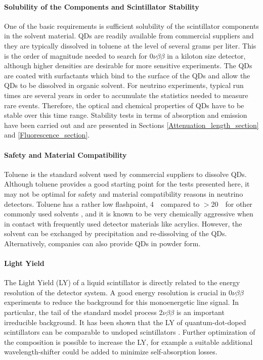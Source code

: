 \documentclass[cits]{JINST}
\begin{document}
\paragraph{Solubility of the Components and Scintillator Stability}
One of the basic requirements is sufficient solubility of the scintillator components in the solvent material. QDs are readily available from commercial suppliers and they are typically dissolved in toluene at the level of several grams per liter. This is the order of magnitude needed to search for 0$\nu\beta\beta$ in a kiloton size detector, although higher densities are desirable for more sensitive experiments\cite{biller}. The QDs are coated with surfactants which bind to the surface of the QDs and allow the QDs to be dissolved in organic solvent. For neutrino experiments, typical run times are several years in order to accumulate the statistics needed to measure rare events. Therefore, the optical and chemical properties of QDs have to be stable over this time range. Stability tests in terms of absorption and emission have been carried out and are presented in Sections \ref{Attenuation_length_section} and \ref{Fluorescence_section}.

\paragraph{Safety and Material Compatibility}
Toluene is the standard solvent used by commercial suppliers to dissolve QDs. Although toluene provides a good starting point for the tests presented here, it may not be optimal for safety and material compatibility reasons in neutrino detectors. Toluene has a rather low flashpoint, 4~\textcelsius~compared to $>$20~\textcelsius~for other commonly used solvents \cite{yeh2007}, and it is known to be very chemically aggressive when in contact with frequently used detector materials like acrylics. However, the solvent can be exchanged by precipitation and re-dissolving of the QDs. Alternatively, companies can also provide QDs in powder form. 

\paragraph{Light Yield} 
The Light Yield (LY) of a liquid scintillator is directly related to the energy resolution of the detector system. A good energy resolution is crucial in 0$\nu\beta\beta$ experiments to reduce the background for this monoenergetic line signal. In particular, the tail of the standard model process 2$\nu\beta\beta$ is an important irreducible background. It has been shown that the LY of quantum-dot-doped scintillators can be comparable to undoped scintillators \cite{mitpaper}. Further optimization of the composition is possible to increase the LY, for example a suitable additional wavelength-shifter could be added to minimize self-absorption losses.
\end{document}
